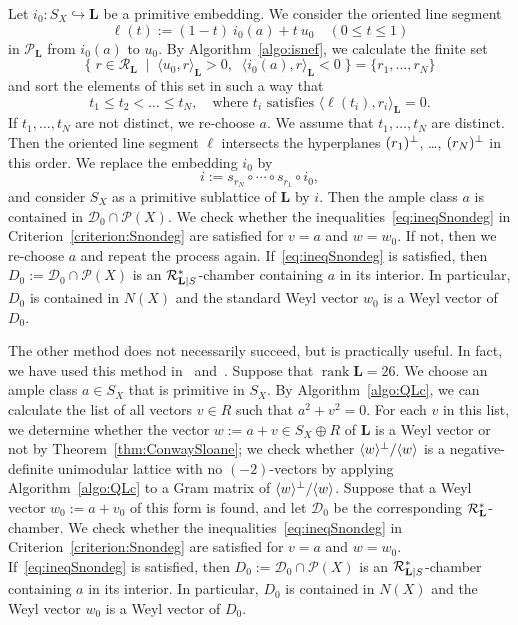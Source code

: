 \documentclass{amsart}
\theoremstyle{plain}
\theoremstyle{definition}
\theoremstyle{remark}
\numberwithin{equation}{section}
\numberwithin{table}{section}
\numberwithin{figure}{section}
\newcommand{\DDD}{\mathord{\mathcal D}}
\newcommand{\PPP}{\mathord{\mathcal P}}
\newcommand{\RRR}{\mathord{\mathcal R}}
\newcommand{\inj}{\hookrightarrow}
\newcommand{\set}[2]{\{\; {#1} \; \mid \; {#2} \;  \}}
\newcommand{\gen}[1]{\langle {#1}  \rangle}
\newcommand{\sperp}{\sp{\perp}}
\newcommand{\rank}{\operatorname{\mathrm {rank}}\nolimits}
\renewcommand{\L}{\mathord{\mathbf{L}}}
\newcommand{\intM}[2]{\langle{#1}\rangle_{#2}}
\newcommand{\Roots}{\RRR}
\newcommand{\sphyp}{\sp*}
\newcommand{\RtsLS}{\Roots_{\L|S}}
\newcommand{\Nc}{N}
\begin{document}
Let $i_0\colon S_X\inj \L$ be  a primitive embedding.
We consider the oriented line segment
$$
\ell(t):=(1-t)\ i_0(a)+t\ u_0\quad ( 0\le t\le 1)
 $$
 in $\PPP_{\L}$
 from $i_0(a)$ to $u_0$.
By Algorithm~\ref{algo:isnef}, 
we calculate the finite set
$$
\set{r\in \Roots_{\L}}{\intM{u_0, r}{\L}>0,\;\; \intM{i_0(a), r}{\L}<0}=\{r_1, \dots, r_N\}
$$
and sort the elements of this set in such a way that
$$
t_1\le t_2<\dots\le t_N, \quad\textrm{where $t_i$ satisfies $\intM{\ell(t_i), r_i}{\L}=0$}.
$$
If  $t_1, \dots, t_N$ are not distinct, 
 we re-choose $a$.
 We assume that $t_1, \dots, t_N$ are distinct.
Then the oriented line segment $\ell$ intersects 
the hyperplanes 
$(r_1)\sperp$, \dots, $(r_N)\sperp$ in this order.
We replace the embedding $i_0$ by
$$
i:=s_{r_N}\circ \cdots \circ s_{r_1}\circ i_0,
$$
and consider $S_X$ as a primitive sublattice of $\L$ by $i$.
Then the ample class $a$ is contained in $\DDD_0\cap \PPP(X)$.
We check  whether the inequalities~\eqref{eq:ineqSnondeg} in Criterion~\ref{criterion:Snondeg} 
are satisfied for $v=a$ and $w=w_0$.
If not,
then we re-choose $a$ and repeat the process  again.
If~\eqref{eq:ineqSnondeg} is satisfied, 
then $D_0:=\DDD_0\cap \PPP(X)$ is an $\RtsLS\sphyp$-chamber
containing $a$ in its interior.
In particular, $D_0$ is contained in $\Nc(X)$ and 
the standard Weyl vector $w_0$ is a Weyl vector of $D_0$.
%
%
\par
%
The other method does not necessarily succeed,
but  is practically useful.
In fact, we have used this method in~\cite{MR3286672} and~\cite{KondoShimada}.
Suppose that $\rank\L=26$.
We choose an ample class $a\in S_X$
that is primitive in $S_X$.
By Algorithm~\ref{algo:QLc},
we can calculate the list of all vectors $v\in R$
such that $a^2+v^2=0$.
For each $v$ in this list,
we determine whether the vector $w:=a+v\in S_X\oplus R$ of $\L$
is a Weyl vector or not by Theorem~\ref{thm:ConwaySloane};
we check whether $\gen{w}\sperp/\gen{w}$
is a negative-definite  unimodular lattice with no $(-2)$-vectors  by applying Algorithm~\ref{algo:QLc}
to a Gram matrix of $\gen{w}\sperp/\gen{w}$.
Suppose that a Weyl vector $w_0:=a+v_0$ of this form is found,
and let $\DDD_0$ be the corresponding $\Roots_{\L}\sphyp$-chamber.
We check  whether the inequalities~\eqref{eq:ineqSnondeg} in Criterion~\ref{criterion:Snondeg} 
are satisfied for $v=a$ and $w=w_0$.
If~\eqref{eq:ineqSnondeg} is satisfied, 
then $D_0:=\DDD_0\cap \PPP(X)$ is an $\RtsLS\sphyp$-chamber
containing $a$ in its interior.
In particular, $D_0$ is contained in $\Nc(X)$ and 
the  Weyl vector $w_0$ is a Weyl vector of $D_0$.
%
%
%
\end{document}
